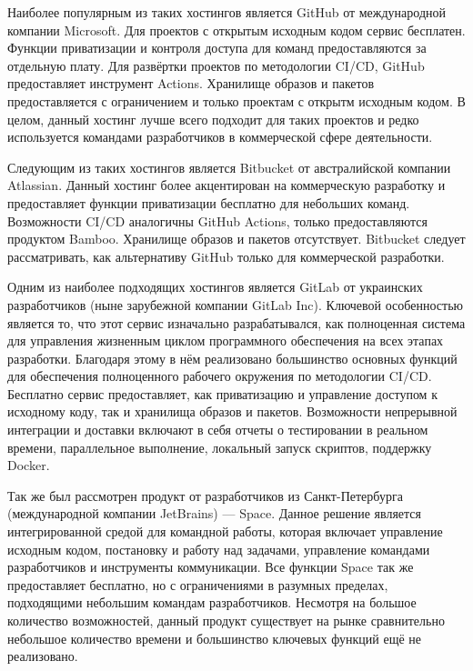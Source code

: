Наиболее популярным из таких хостингов является GitHub от международной компании Microsoft.
Для проектов с открытым исходным кодом сервис бесплатен.
Функции приватизации и контроля доступа для команд предоставляются за отдельную плату.
Для развёртки проектов по методологии CI/CD, GitHub предоставляет инструмент Actions.
Хранилище образов и пакетов предоставляется с ограничением и только проектам с открытм исходным кодом.
В целом, данный хостинг лучше всего подходит для таких проектов и редко используется командами разработчиков в коммерческой сфере деятельности.

Следующим из таких хостингов является Bitbucket\cite{web:bitbucket} от австралийской компании Atlassian.
Данный хостинг более акцентирован на коммерческую разработку и предоставляет функции приватизации бесплатно для небольших команд.
Возможности CI/CD аналогичны GitHub Actions, только предоставляются продуктом Bamboo.
Хранилище образов и пакетов отсутствует.
Bitbucket следует рассматривать, как альтернативу GitHub только для коммерческой разработки\cite{web:github:docs}.

Одним из наиболее подходящих хостингов является GitLab от украинских разработчиков (ныне зарубежной компании GitLab Inc).
Ключевой особенностью является то, что этот сервис изначально разрабатывался,
как полноценная система для управления жизненным циклом программного обеспечения на всех этапах разработки.
Благодаря этому в нём реализовано большинство основных функций для обеспечения полноценного рабочего окружения по методологии CI/CD.
Бесплатно сервис предоставляет, как приватизацию и управление доступом к исходному коду, так и хранилища образов и пакетов.
Возможности непрерывной интеграции и доставки включают в себя отчеты о тестировании в реальном времени, параллельное выполнение, локальный запуск скриптов, поддержку Docker\cite{web:gitlab}.

Так же был рассмотрен продукт от разработчиков из Санкт-Петербурга (международной компании JetBrains) --- Space\cite{web:space:docs}.
Данное решение является интегрированной средой для командной работы, которая включает управление исходным кодом, постановку и работу над задачами, управление командами разработчиков и инструменты коммуникации.
Все функции Space так же предоставляет бесплатно, но с ограничениями в разумных пределах, подходящими небольшим командам разработчиков.
Несмотря на большое количество возможностей, данный продукт существует на рынке сравнительно небольшое количество времени и большинство ключевых функций ещё не реализовано.

